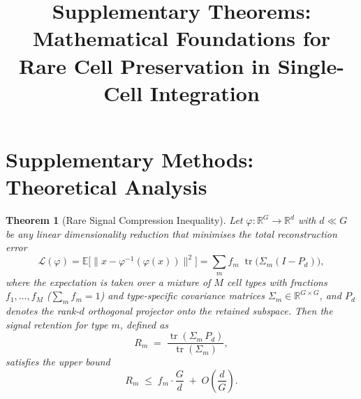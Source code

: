 \documentclass[11pt]{article}
\title{Supplementary Theorems: Mathematical Foundations for\\
Rare Cell Preservation in Single-Cell Integration}
\author{}
\date{}
\newtheorem{theorem}{Theorem}
\DeclareMathOperator{\tr}{tr}
\begin{document}
\maketitle

\section*{Supplementary Methods: Theoretical Analysis}


\begin{theorem}[Rare Signal Compression Inequality]
\label{thm:compression}
Let $\varphi \colon \mathbb{R}^G \to \mathbb{R}^d$ with $d \ll G$ be any linear
dimensionality reduction that minimises the total reconstruction error
\[
    \mathcal{L}(\varphi)
    = \mathbb{E}\bigl[\|x - \varphi^{-1}(\varphi(x))\|^2\bigr]
    = \sum_{m} f_m \;\tr\!\bigl(\Sigma_m (I - P_d)\bigr),
\]
where the expectation is taken over a mixture of $M$ cell types with
fractions $f_1,\dots,f_M$ ($\sum_m f_m = 1$) and type-specific covariance
matrices $\Sigma_m \in \mathbb{R}^{G \times G}$, and $P_d$ denotes the
rank-$d$ orthogonal projector onto the retained subspace.  Then the
\emph{signal retention} for type $m$, defined as
\[
    R_m \;=\; \frac{\tr(\Sigma_m\, P_d)}{\tr(\Sigma_m)},
\]
satisfies the upper bound
\begin{equation}
\label{eq:retention-bound}
    R_m \;\le\; f_m \cdot \frac{G}{d} \;+\; O\!\!\left(\frac{d}{G}\right).
\end{equation}
\end{theorem}
\end{document}
